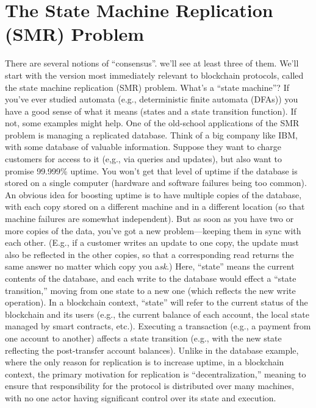 \section{The State Machine Replication (SMR) Problem}
There are several notions of “consensus”. we’ll see at least three of them. We’ll start with the version most immediately relevant to blockchain protocols, called the state machine replication
(SMR) problem. What’s a “state machine”? If you’ve ever studied automata (e.g., deterministic finite automata (DFAs)) you have a good sense of what it means (states and a state
transition function). If not, some examples might help.
One of the old-school applications of the SMR problem is managing a replicated database.
Think of a big company like IBM, with some database of valuable information. Suppose
they want to charge customers for access to it (e,g., via queries and updates), but also want
to promise 99.999\% uptime. You won’t get that level of uptime if the database is stored
on a single computer (hardware and software failures being too common). An obvious
idea for boosting uptime is to have multiple copies of the database, with each copy stored
on a different machine and in a different location (so that machine failures are somewhat
independent). But as soon as you have two or more copies of the data, you’ve got a new
problem—keeping them in sync with each other. (E.g., if a customer writes an update to
one copy, the update must also be reflected in the other copies, so that a corresponding read
returns the same answer no matter which copy you a\textit{sk}.) Here, “state” means the current
contents of the database, and each write to the database would effect a “state transition,”
moving from one state to a new one (which reflects the new write operation).
In a blockchain context, “state” will refer to the current status of the blockchain and its
users (e.g., the current balance of each account, the local state managed by smart contracts, etc.). Executing a transaction (e.g., a payment from one account to another) affects a state
transition (e.g., with the new state reflecting the post-transfer account balances). Unlike
in the database example, where the only reason for replication is to increase uptime, in a
blockchain context, the primary motivation for replication is “decentralization,” meaning to
ensure that responsibility for the protocol is distributed over many machines, with no one
actor having significant control over its state and execution.

